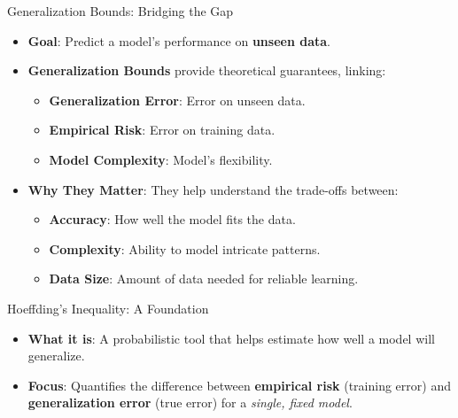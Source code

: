 \documentclass[
  ignorenonframetext,
]{beamer}
\providecommand{\tightlist}{%
  \setlength{\itemsep}{0pt}\setlength{\parskip}{0pt}}\usepackage{longtable,booktabs,array}
\begin{document}
\begin{frame}{Generalization Bounds: Bridging the Gap}
\label{generalization-bounds-bridging-the-gap}
\begin{itemize}
\tightlist
\item
  \textbf{Goal}: Predict a model's performance on \textbf{unseen data}.
\item
  \textbf{Generalization Bounds} provide theoretical guarantees,
  linking:

  \begin{itemize}
  \tightlist
  \item
    \textbf{Generalization Error}: Error on unseen data.
  \item
    \textbf{Empirical Risk}: Error on training data.
  \item
    \textbf{Model Complexity}: Model's flexibility.
  \end{itemize}
\item
  \textbf{Why They Matter}: They help understand the trade-offs between:

  \begin{itemize}
  \tightlist
  \item
    \textbf{Accuracy}: How well the model fits the data.
  \item
    \textbf{Complexity}: Ability to model intricate patterns.
  \item
    \textbf{Data Size}: Amount of data needed for reliable learning.
  \end{itemize}
\end{itemize}
\end{frame}

\begin{frame}{Hoeffding's Inequality: A Foundation}
\label{hoeffdings-inequality-a-foundation}
\begin{itemize}
\tightlist
\item
  \textbf{What it is}: A probabilistic tool that helps estimate how well
  a model will generalize.
\item
  \textbf{Focus}: Quantifies the difference between \textbf{empirical
  risk} (training error) and \textbf{generalization error} (true error)
  for a \emph{single, fixed model}.
\end{itemize}
\end{frame}
\end{document}

